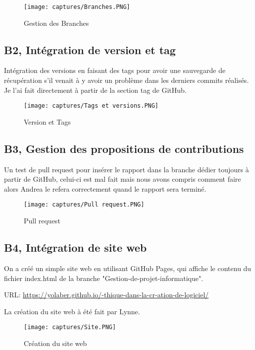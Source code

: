 \documentclass{article}
\begin{document}
\begin{figure}[H]
    \centering
    \texttt{[image: captures/Branches.PNG]}
    \caption{Gestion des Branches}
    \label{Branche}
\end{figure}

\subsection{B2, Intégration de version et tag}

Intégration des versions en faisant des tags pour avoir une sauvegarde de récupération s'il venait à y avoir un problème dans les derniers commits réalisés.\\
Je l'ai fait directement à partir de la section tag de GitHub.

\begin{figure}[H]
    \centering
    \texttt{[image: captures/Tags et versions.PNG]}
    \caption{Version et Tags}
    \label{TagVer}
\end{figure}

\subsection{B3, Gestion des propositions de contributions}
Un test de pull request pour insérer le rapport dans la branche dédier toujours à partir de GitHub, celui-ci est mal fait mais nous avons compris comment faire alors Andrea le refera correctement quand le rapport sera terminé. \\

\begin{figure}[H]
    \centering
    \texttt{[image: captures/Pull request.PNG]}
    \caption{Pull request}
    \label{Pull}
\end{figure}

\subsection{B4, Intégration de site web}
On a créé un simple site web en utilisant GitHub Pages, qui affiche le contenu du fichier index.html de la branche "Gestion-de-projet-informatique".

URL:  \url{https://yolaber.github.io/-thique-dans-la-cr-ation-de-logiciel/}

La création du site web à été fait par Lynne.

\begin{figure}[H]
    \centering
    \texttt{[image: captures/Site.PNG]}
    \caption{Création du site web}
    \label{Créasite}
\end{figure}
\end{document}
